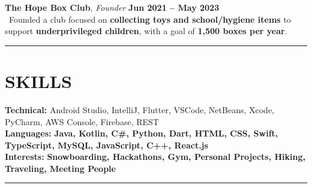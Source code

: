 \documentclass[a4paper,10pt]{article}
\newcommand{\sectionline}{\noindent\rule{\textwidth}{0.6pt}}
\begin{document}
\textbf{The Hope Box Club}, \textit{Founder} \hfill \textbf{Jun 2021 – May 2023}\\
\textbullet\ Founded a club focused on \textbf{collecting toys and school/hygiene items} to support \textbf{underprivileged children}, with a goal of \textbf{1,500 boxes per year}.

\sectionline

\section*{SKILLS}
\textbf{Technical:} Android Studio, IntelliJ, Flutter, VSCode, NetBeans, Xcode, PyCharm, AWS Console, Firebase, REST\\
\textbf{Languages:} \textbf{Java, Kotlin, C\#, Python, Dart, HTML, CSS, Swift, TypeScript, MySQL, JavaScript, C++, React.js}\\
\textbf{Interests:} \textbf{Snowboarding, Hackathons, Gym, Personal Projects, Hiking, Traveling, Meeting People}

\sectionline
\end{document}
